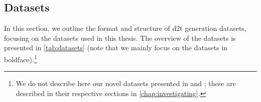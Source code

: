 {%

\subsection{Datasets}
\label{sec:datasets}

In this section, we outline the format and structure of \ac{d2t} generation datasets, focusing on the datasets used in this thesis. The overview of the datasets is presented in \autoref{tab:datasets} (note that we mainly focus on the datasets in boldface).\footnote{We do not describe here our novel datasets presented in \citet{kasnerMindLabelsDescribing2022} and \citet{kasnerReferenceBasedMetricsAnalyzing2024}; these are described in their respective sections in \autoref{chap:investigating}.}

}
